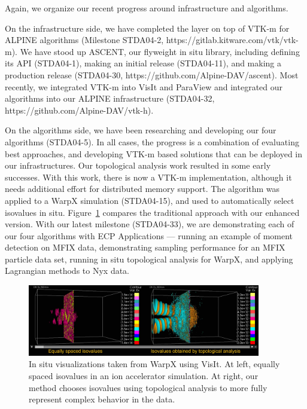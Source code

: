 Again, we organize our recent progress around infrastructure and algorithms.

On the infrastructure side, we have completed the layer on top of VTK-m for ALPINE algorithms (Milestone STDA04-2, https://gitlab.kitware.com/vtk/vtk-m). 
%
We have stood up ASCENT, our flyweight in situ library, including defining its API (STDA04-1), making an initial release (STDA04-11), and making a production release (STDA04-30, https://github.com/Alpine-DAV/ascent).
Most recently, we integrated VTK-m into VisIt and ParaView and integrated our algorithms into our ALPINE infrastructure (STDA04-32, https://github.com/Alpine-DAV/vtk-h).

On the algorithms side, we have been researching and developing our four algorithms (STDA04-5).
%
In all cases, the progress is a combination of evaluating best approaches, and developing VTK-m based solutions that
can be deployed in our infrastructures.
%
Our topological analysis work resulted in some early successes.
%
With this work, there is now a VTK-m implementation, although it needs additional effort for distributed memory support.
%
The algorithm was applied to a WarpX simulation (STDA04-15), and used to automatically select isovalues in situ.
%
Figure~\ref{fig:alpine_topology} compares the traditional approach with our enhanced version.
%
With our latest milestone (STDA04-33), we are demonstrating each of our four algorithms with ECP Applications --- running an example of moment detection on MFIX data, demonstrating sampling performance for an MFIX particle data set, running in situ topological analysis for WarpX, and applying Lagrangian methods to Nyx data.

\begin{figure}[htb]
	\centering
	\includegraphics[width=4in]{projects/2.3.4-DataViz/2.3.4.16-ALPINE-ZFP/alpine_topology}
	\caption{\label{fig:alpine_topology}In situ visualizations taken from WarpX using VisIt.  At left, equally spaced isovalues in an ion accelerator simulation. At right, our method chooses isovalues using topological analysis to more fully represent complex behavior in the data.}
\end{figure}


